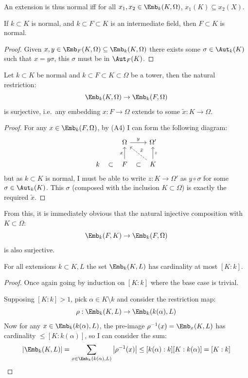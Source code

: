 \documentclass{article}
\begin{document}
An extension is thus normal iff for all $x_1,x_2\in \Emb_k(K,\Omega)$, $x_1(K)\subseteq x_2(X)$.

\begin{lemma}
    If $k\subset K$ is normal, and $k\subset F \subset K$ is an intermediate field, then $F\subset K$ is normal.
    \begin{proof}
        Given $x,y\in\Emb_F(K,\Omega)\subseteq\Emb_k(K,\Omega)$ there exists some $\sigma\in\Aut_k(K)$ such that $x=y\sigma$, this $\sigma$ must be in $\Aut_F(K)$.
    \end{proof}
\end{lemma}

\begin{proposition}
    Let $k\subset K$ be normal and $k\subset F \subset K \subset \Omega$ be a tower, then the natural restriction: \[
    \Emb_k(K,\Omega)\rightarrow \Emb_k(F,\Omega)
    \] is surjective, i.e.~any embedding $x:F\rightarrow\Omega$ extends to some $\tilde{x}:K\rightarrow\Omega$.\begin{proof}
    For any $x\in\Emb_k(F,\Omega)$, by (A4) I can form the following diagram: \[
    \begin{tikzcd}
        & \Omega \arrow[r, "y"] & \Omega' \\
        k \arrow[r, phantom, sloped, "\subset"] & F\arrow[r, phantom, sloped, "\subset"] \arrow[u, "x"] & K \arrow[u, "z", swap] \arrow[ul, dashed, "\tilde{x}", swap]
    \end{tikzcd} 
    \] but as $k\subset K$ is normal, I must be able to write $z:K\rightarrow\Omega'$ as $y\circ\sigma$ for some $\sigma\in\Aut_k(K)$. This $\sigma$ (composed with the inclusion $K\subset\Omega$) is exactly the required $\tilde{x}$.
\end{proof}
\end{proposition}

From this, it is immediately obvious that the natural injective composition with $K\subset\Omega$: \[
    \Emb_k(F,K)\rightarrow\Emb_k(F,\Omega)
\] is also surjective.

\begin{proposition}[A1]
    For all extensions $k\subset K,L$ the set $\Emb_k(K,L)$ has cardinality at most $[K:k]$.
    \begin{proof}
        Once again going by induction on $[K:k]$ where the base case is trivial.

        Supposing $[K:k]>1$, pick $\alpha\in K\setminus k$ and consider the restriction map: \[
            \rho:\Emb_k(K,L)\rightarrow \Emb_k(k(\alpha),L)
        \] Now for any $x\in \Emb_k(k(\alpha),L)$, the pre-image $\rho^{-1}(x)=\Emb_x(K,L)$ has cardinality $\leq[K:k(\alpha)]$, so I can consider the sum: \[
            \abs{\Emb_k(K,L)} = \sum_{x\in\Emb_k(k(\alpha),L)}\abs{\rho^{-1}(x)} \leq [k(\alpha):k][K:k(\alpha)] = [K:k]\qedhere
        \]
    \end{proof}
\end{proposition}
\end{document}
